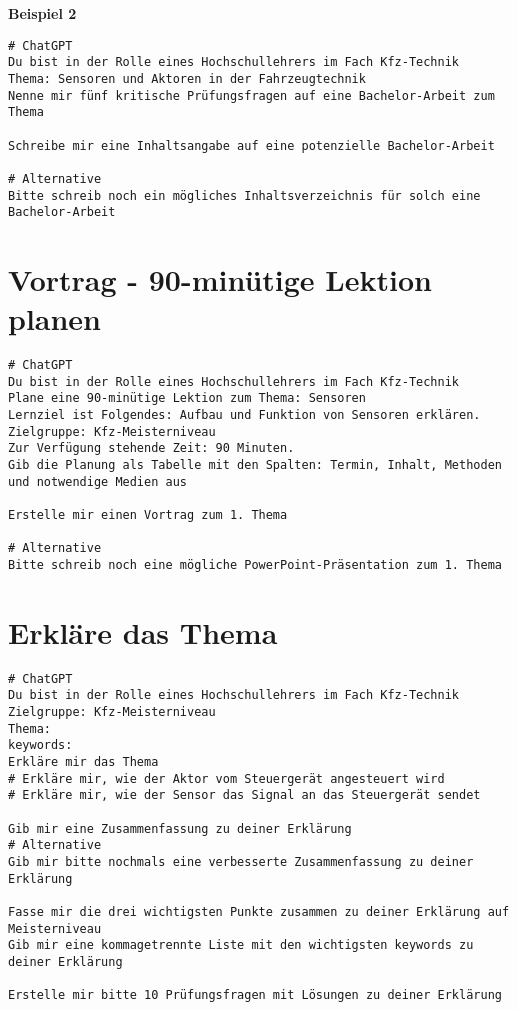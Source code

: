 \documentclass[12pt,a4paper]{scrartcl}
\begin{document}
\textbf{Beispiel 2}

\begin{lstlisting}
# ChatGPT
Du bist in der Rolle eines Hochschullehrers im Fach Kfz-Technik
Thema: Sensoren und Aktoren in der Fahrzeugtechnik
Nenne mir fünf kritische Prüfungsfragen auf eine Bachelor-Arbeit zum Thema

Schreibe mir eine Inhaltsangabe auf eine potenzielle Bachelor-Arbeit

# Alternative
Bitte schreib noch ein mögliches Inhaltsverzeichnis für solch eine Bachelor-Arbeit
\end{lstlisting}

\hypertarget{vortrag---90-minuxfctige-lektion-planen}{%
\section{Vortrag - 90-minütige Lektion
planen}\label{vortrag---90-minuxfctige-lektion-planen}}

\begin{lstlisting}
# ChatGPT
Du bist in der Rolle eines Hochschullehrers im Fach Kfz-Technik
Plane eine 90-minütige Lektion zum Thema: Sensoren
Lernziel ist Folgendes: Aufbau und Funktion von Sensoren erklären. 
Zielgruppe: Kfz-Meisterniveau
Zur Verfügung stehende Zeit: 90 Minuten.
Gib die Planung als Tabelle mit den Spalten: Termin, Inhalt, Methoden und notwendige Medien aus

Erstelle mir einen Vortrag zum 1. Thema

# Alternative
Bitte schreib noch eine mögliche PowerPoint-Präsentation zum 1. Thema
\end{lstlisting}

\hypertarget{erkluxe4re-das-thema}{%
\section{Erkläre das Thema}\label{erkluxe4re-das-thema}}

\begin{lstlisting}
# ChatGPT
Du bist in der Rolle eines Hochschullehrers im Fach Kfz-Technik
Zielgruppe: Kfz-Meisterniveau
Thema: 
keywords: 
Erkläre mir das Thema
# Erkläre mir, wie der Aktor vom Steuergerät angesteuert wird
# Erkläre mir, wie der Sensor das Signal an das Steuergerät sendet

Gib mir eine Zusammenfassung zu deiner Erklärung
# Alternative
Gib mir bitte nochmals eine verbesserte Zusammenfassung zu deiner Erklärung

Fasse mir die drei wichtigsten Punkte zusammen zu deiner Erklärung auf Meisterniveau
Gib mir eine kommagetrennte Liste mit den wichtigsten keywords zu deiner Erklärung

Erstelle mir bitte 10 Prüfungsfragen mit Lösungen zu deiner Erklärung
\end{lstlisting}
\end{document}
